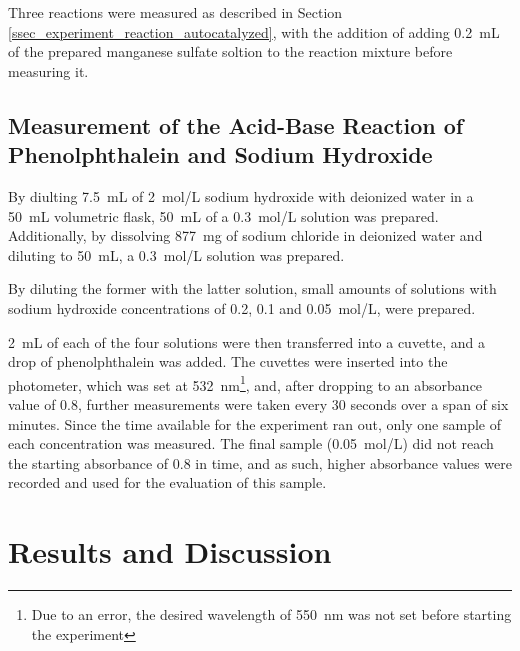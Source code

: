 \documentclass[titlepage]{article}
\begin{document}
Three reactions were measured as described in Section \ref{ssec_experiment_reaction_autocatalyzed}, with the addition of adding 0.2~mL of the prepared manganese sulfate soltion to the reaction mixture before measuring it.

\subsection{Measurement of the Acid-Base Reaction of Phenolphthalein and Sodium Hydroxide}
By diulting 7.5~mL of 2~mol/L sodium hydroxide with deionized water in a 50~mL volumetric flask, 50~mL of a 0.3~mol/L solution was prepared. Additionally, by dissolving 877~mg of sodium chloride in deionized water and diluting to 50~mL, a 0.3~mol/L solution was prepared.

By diluting the former with the latter solution, small amounts of solutions with sodium hydroxide concentrations of 0.2, 0.1 and 0.05~mol/L, were prepared.

2~mL of each of the four solutions were then transferred into a cuvette, and a drop of phenolphthalein was added. The cuvettes were inserted into the photometer, which was set at 532~nm\footnote{Due to an error, the desired wavelength of 550~nm was not set before starting the experiment}, and, after dropping to an absorbance value of 0.8, further measurements were taken every 30 seconds over a span of six minutes. Since the time available for the experiment ran out, only one sample of each concentration was measured. The final sample (0.05~mol/L) did not reach the starting absorbance of 0.8 in time, and as such, higher absorbance values were recorded and used for the evaluation of this sample.

\newpage
\section{Results and Discussion}
\end{document}

